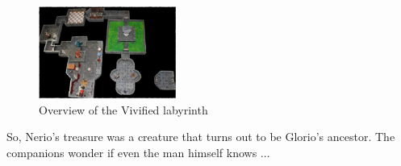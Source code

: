 \begin{figure}[h]
	\centering
	\includegraphics[width=0.4\textwidth]{images/Overview-of-the-Vivified-labyrinth-565302683_mod.jpg}
	\caption{Overview of the Vivified labyrinth}
	\label{fig:Overview-of-the-Vivified-labyrinth-565302683}
\end{figure}

So, Nerio's treasure was a creature that turns out to be Glorio's ancestor. The companions wonder if even the man himself knows ...\\


